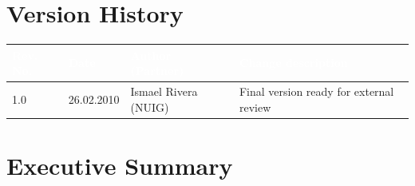 \documentclass{fast_latex}
\begin{document}


\section*{Version History}

\begin{small}
\begin{tabular}{|l|l|l|p{7.5cm}|}
\hline
\rowcolor{fast@lightgrey}\textcolor{white}{\textbf{Rev. No.}} &
                            \textcolor{white}{\textbf{Date}} &
                            \textcolor{white}{\textbf{Author (Partner)}} &
							\textcolor{white}{\textbf{Change description}}\\ \hline
1.0 & 26.02.2010 & Ismael Rivera (NUIG) & Final version ready for external review \\ \hline
\end{tabular}
\end{small}

\color{black}

\vfill

\newpage


\clearpage

\section*{Executive Summary}
\doublespacing
\end{document}
